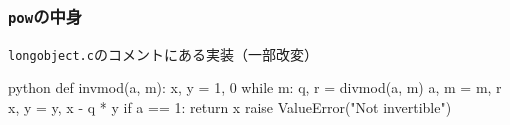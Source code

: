 \documentclass[aspectratio=169,dvipdfmx,14pt,notheorems]{beamer}
\theoremstyle{definition}
\newtheorem{theorem}{定理}
\begin{document}
%


\begin{frame}[fragile]\frametitle{\texttt{pow}の中身}
\begin{block}{\texttt{longobject.c}のコメントにある実装（一部改変）}
\begin{pygments}{python}
def invmod(a, m):
    x, y = 1, 0
    while m:
        q, r = divmod(a, m)
        a, m = m, r
        x, y = y, x - q * y
    if a == 1:
        return x
    raise ValueError("Not invertible")
\end{pygments}
\end{block}
\end{frame}
\end{document}
